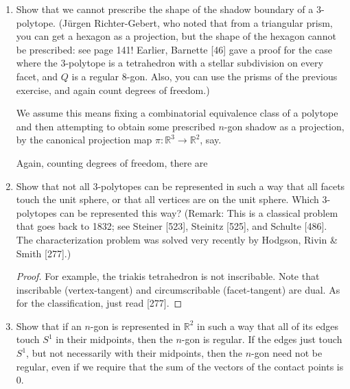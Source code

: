 \documentclass{article}
\begin{document}
\begin{enumerate}
\begin{solution}
    We can think of these choices as vectors in $\mathbb{R}^{n+3}$ and $\mathbb{R}^{2n-3}$. Then, because a lower dimensional subspace has measure $0$ in the original space, when $n\geq 7$ (i.e. when $2n-3 > n+3$ we get that almost never can two "generic" (randomly, perhaps) prescribed facets be built into a prism.
\end{solution}

\item Show that we cannot prescribe the shape of the shadow boundary of a $3$-polytope. (J\"urgen Richter-Gebert, who noted that from a triangular prism, you can get a hexagon as a projection, but the shape of the hexagon cannot be prescribed: see page 141! Earlier, Barnette [46] gave a proof for the case where the $3$-polytope is a tetrahedron with a stellar subdivision on every facet, and $Q$ is a regular $8$-gon. Also, you can use the prisms of the previous exercise, and again count degrees of freedom.)

\begin{solution}
    We assume this means fixing a combinatorial equivalence class of a polytope and then attempting to obtain some prescribed $n$-gon shadow as a projection, by the canonical projection map $\pi: \mathbb{R}^3 \to \mathbb{R}^2$, say. 

    Again, counting degrees of freedom, there are 

\end{solution}

\item Show that not all $3$-polytopes can be represented in such a way that all facets touch the unit sphere, or that all vertices are on the unit sphere. Which $3$-polytopes can be represented this way? (Remark: This is a classical problem that goes back to 1832; see Steiner [523], Steinitz [525], and Schulte [486]. The characterization problem was solved very recently by Hodgson, Rivin \& Smith [277].)

\begin{proof}
For example, the triakis tetrahedron is not inscribable. Note that inscribable (vertex-tangent) and circumscribable (facet-tangent) are dual. As for the classification, just read [277].
\end{proof}

\item Show that if an $n$-gon is represented in $\mathbb{R}^2$ in such a way that all of its edges touch $S^1$ in their midpoints, then the $n$-gon is regular. If the edges just touch $S^1$, but not necessarily with their midpoints, then the $n$-gon need not be regular, even if we require that the sum of the vectors of the contact points is $0$.


\end{enumerate}
\end{document}
